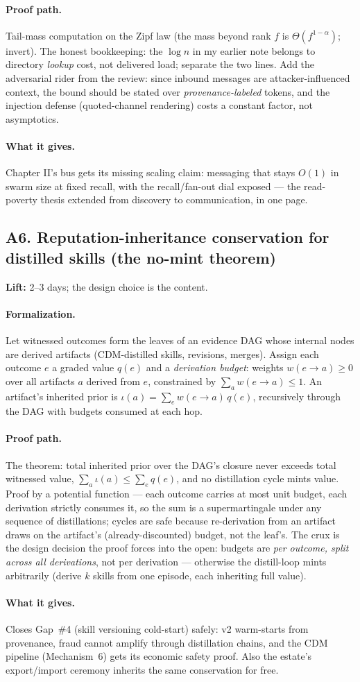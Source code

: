 \documentclass[11pt,a4paper]{article}
\newcommand{\lift}[1]{\noindent\textbf{Lift:} #1.}
\newcommand{\gives}{\paragraph{What it gives.}}
\newcommand{\form}{\paragraph{Formalization.}}
\newcommand{\proofpath}{\paragraph{Proof path.}}
\begin{document}
\proofpath Tail-mass computation on the Zipf law (the mass beyond rank $f$ is $\Theta(f^{1-\alpha})$; invert). The honest bookkeeping: the $\log n$ in my earlier note belongs to directory \emph{lookup} cost, not delivered load; separate the two lines. Add the adversarial rider from the review: since inbound messages are attacker-influenced context, the bound should be stated over \emph{provenance-labeled} tokens, and the injection defense (quoted-channel rendering) costs a constant factor, not asymptotics.

\gives Chapter II's bus gets its missing scaling claim: messaging that stays $O(1)$ in swarm size at fixed recall, with the recall/fan-out dial exposed --- the read-poverty thesis extended from discovery to communication, in one page.

\subsection{A6. Reputation-inheritance conservation for distilled skills (the no-mint theorem)}
\lift{2--3 days; the design choice is the content}

\form Let witnessed outcomes form the leaves of an evidence DAG whose internal nodes are derived artifacts (CDM-distilled skills, revisions, merges). Assign each outcome $e$ a graded value $q(e)$ and a \emph{derivation budget}: weights $w(e \to a) \ge 0$ over all artifacts $a$ derived from $e$, constrained by $\sum_a w(e\to a) \le 1$. An artifact's inherited prior is $\iota(a) = \sum_e w(e\to a)\, q(e)$, recursively through the DAG with budgets consumed at each hop.

\proofpath The theorem: total inherited prior over the DAG's closure never exceeds total witnessed value, $\sum_a \iota(a) \le \sum_e q(e)$, and no distillation cycle mints value. Proof by a potential function --- each outcome carries at most unit budget, each derivation strictly consumes it, so the sum is a supermartingale under any sequence of distillations; cycles are safe because re-derivation from an artifact draws on the artifact's (already-discounted) budget, not the leaf's. The crux is the design decision the proof forces into the open: budgets are \emph{per outcome, split across all derivations}, not per derivation --- otherwise the distill-loop mints arbitrarily (derive $k$ skills from one episode, each inheriting full value).

\gives Closes Gap~\#4 (skill versioning cold-start) safely: v2 warm-starts from provenance, fraud cannot amplify through distillation chains, and the CDM pipeline (Mechanism~6) gets its economic safety proof. Also the estate's export/import ceremony inherits the same conservation for free.
\end{document}
